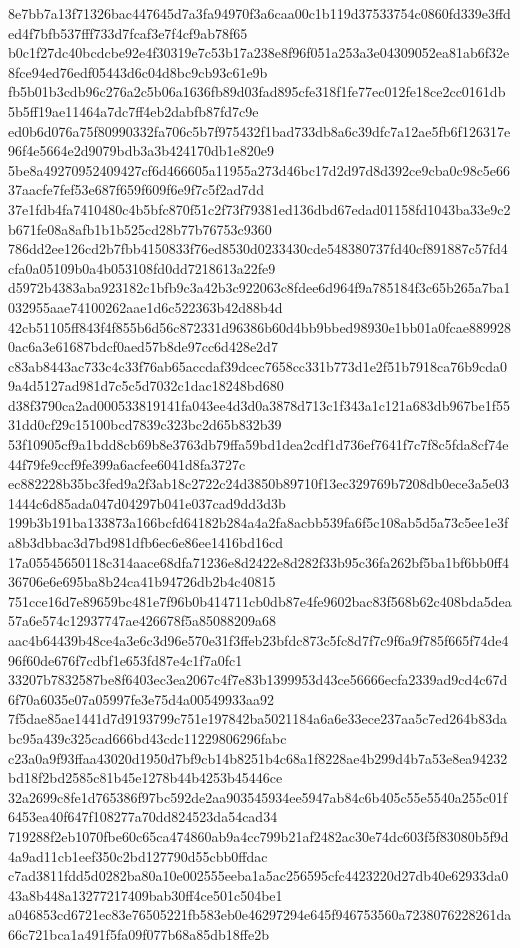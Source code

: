 \documentclass[11pt,a4paper]{article}
\begin{document}
{8e7bb7a13f71326bac447645d7a3fa94970f3a6caa00c1b119d37533754c0860fd339e3ffded4f7bfb537fff733d7fcaf3e7f4cf9ab78f65
b0c1f27dc40bcdcbe92e4f30319e7c53b17a238e8f96f051a253a3e04309052ea81ab6f32e8fce94ed76edf05443d6c04d8bc9cb93c61e9b
fb5b01b3cdb96c276a2c5b06a1636fb89d03fad895cfe318f1fe77ec012fe18ce2cc0161db5b5ff19ae11464a7dc7ff4eb2dabfb87fd7c9e
ed0b6d076a75f80990332fa706c5b7f975432f1bad733db8a6c39dfc7a12ae5fb6f126317e96f4e5664e2d9079bdb3a3b424170db1e820e9
5be8a49270952409427cf6d466605a11955a273d46bc17d2d97d8d392ce9cba0c98c5e6637aacfe7fef53e687f659f609f6e9f7c5f2ad7dd
37e1fdb4fa7410480c4b5bfc870f51c2f73f79381ed136dbd67edad01158fd1043ba33e9c2b671fe08a8afb1b1b525cd28b77b76753c9360
786dd2ee126cd2b7fbb4150833f76ed8530d0233430cde548380737fd40cf891887c57fd4cfa0a05109b0a4b053108fd0dd7218613a22fe9
d5972b4383aba923182c1bfb9c3a42b3c922063c8fdee6d964f9a785184f3c65b265a7ba1032955aae74100262aae1d6c522363b42d88b4d
42cb51105ff843f4f855b6d56c872331d96386b60d4bb9bbed98930e1bb01a0fcae8899280ac6a3e61687bdcf0aed57b8de97cc6d428e2d7
c83ab8443ac733c4c33f76ab65accdaf39dcec7658cc331b773d1e2f51b7918ca76b9cda09a4d5127ad981d7c5c5d7032c1dac18248bd680
d38f3790ca2ad000533819141fa043ee4d3d0a3878d713c1f343a1c121a683db967be1f5531dd0cf29c15100bcd7839c323bc2d65b832b39
53f10905cf9a1bdd8cb69b8e3763db79ffa59bd1dea2cdf1d736ef7641f7c7f8c5fda8cf74e44f79fe9ccf9fe399a6acfee6041d8fa3727c
ec882228b35bc3fed9a2f3ab18c2722c24d3850b89710f13ec329769b7208db0ece3a5e031444c6d85ada047d04297b041e037cad9dd3d3b
199b3b191ba133873a166bcfd64182b284a4a2fa8acbb539fa6f5c108ab5d5a73c5ee1e3fa8b3dbbac3d7bd981dfb6ec6e86ee1416bd16cd
17a05545650118c314aace68dfa71236e8d2422e8d282f33b95c36fa262bf5ba1bf6bb0ff436706e6e695ba8b24ca41b94726db2b4c40815
751cce16d7e89659bc481e7f96b0b414711cb0db87e4fe9602bac83f568b62c408bda5dea57a6e574c12937747ae426678f5a85088209a68
aac4b64439b48ce4a3e6c3d96e570e31f3ffeb23bfdc873c5fc8d7f7c9f6a9f785f665f74de496f60de676f7cdbf1e653fd87e4c1f7a0fc1
33207b7832587be8f6403ec3ea2067c4f7e83b1399953d43ce56666ecfa2339ad9cd4c67d6f70a6035e07a05997fe3e75d4a00549933aa92
7f5dae85ae1441d7d9193799c751e197842ba5021184a6a6e33ece237aa5c7ed264b83dabc95a439c325cad666bd43cdc11229806296fabc
c23a0a9f93ffaa43020d1950d7bf9cb14b8251b4c68a1f8228ae4b299d4b7a53e8ea94232bd18f2bd2585c81b45e1278b44b4253b45446ce
32a2699c8fe1d765386f97bc592de2aa903545934ee5947ab84c6b405c55e5540a255c01f6453ea40f647f108277a70dd824523da54cad34
719288f2eb1070fbe60c65ca474860ab9a4cc799b21af2482ac30e74dc603f5f83080b5f9d4a9ad11cb1eef350c2bd127790d55cbb0ffdac
c7ad3811fdd5d0282ba80a10e002555eeba1a5ac256595cfc4423220d27db40e62933da043a8b448a13277217409bab30ff4ce501c504be1
a046853cd6721ec83e76505221fb583eb0e46297294e645f946753560a7238076228261da66c721bca1a491f5fa09f077b68a85db18ffe2b
}
\end{document}
